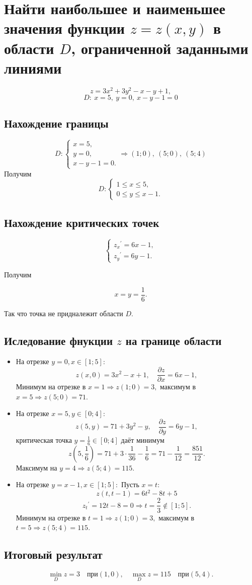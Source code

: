 \section{Найти наибольшее и наименьшее значения функции $z = z(x, y)$ в области $D$,
ограниченной заданными линиями}
\[
z = 3x^2 + 3y^2 -x -y + 1,
\]
\[
D:\ x = 5,\ y = 0,\ x - y - 1 = 0
\]

\subsection{Нахождение границы}

\[
D :
\begin{cases}
x = 5,\\
y = 0,\\
x - y - 1 = 0.
\end{cases}
\Rightarrow (1;0),\ (5;0),\ (5;4)
\]
Получим 
\[
D:
\begin{cases}
1 \leq x \leq 5, \\
0 \leq y \leq x-1.
\end{cases}
\]

\subsection{Нахождение критических точек}

\[
\begin{cases}
{z_x}^{\prime} = 6x - 1,\\
{z_y}^{\prime} = 6y - 1.
\end{cases}
\]

Получим 

\[
x = y = \frac{1}{6}.
\]

Так что точка не придналежит области \(D\).

\subsection{Иследование фнукции \(z\) на границе области}

\begin{itemize}
\item На отрезке \(y = 0, x \in [1;5]:\)
\[z(x,0) = 3x^2 - x + 1, \quad \frac{\partial z}{\partial x} = 6x - 1,\]
Минимум на отрезке в \(x = 1 \Rightarrow z(1;0) = 3,\)
максимум в \(x = 5 \Rightarrow z(5;0) = 71.\)
\item На отрезке \(x = 5, y \in [0;4]:\)
\[z(5,y) = 71 + 3y^2 - y, \quad \frac{\partial z}{\partial y} = 6y - 1,\]
критическая точка \(y = \frac{1}{6} \in [0;4]\) даёт минимум
\[z(5,\frac{1}{6}) = 71 + 3\cdot \frac{1}{36} - \frac{1}{6} = 71 - \frac{1}{12} = \frac{851}{12}.\]
Максимум на \(y = 4 \Rightarrow z(5;4) = 115.\)
\item На отрезке \(y = x - 1, x \in [1;5]:\)
Пусть \(x = t:\)
\[z(t,t-1) = 6t^2 -8t +5 \]
\[{z_t}^{\prime} = 12t - 8 = 0 \Rightarrow t = \frac{2}{3} \notin [1;5].\]
Минимум на отрезке в \(t = 1 \Rightarrow z(1;0) = 3,\)
максимум в \(t = 5 \Rightarrow z(5;4) = 115.\)
\end{itemize}

\subsection{Итоговый результат}

\[
\boxed{ \min\limits_{D} z = 3 \quad \text{при} (1,0), \quad \max\limits_{D} z = 115 \quad \text{при} (5,4).}
\]
